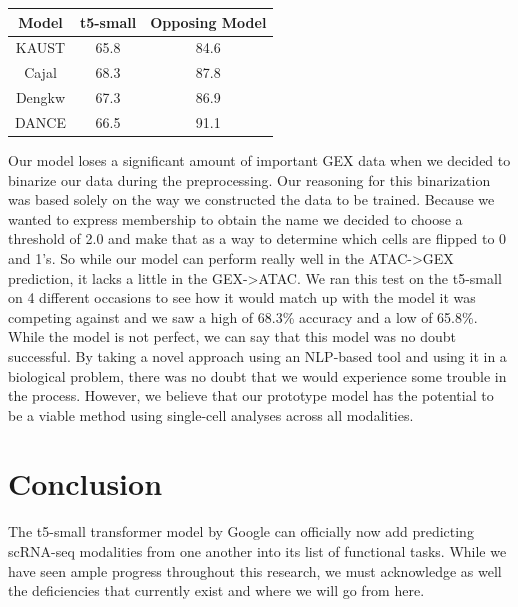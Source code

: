 \begin{table}[h!]
\centering
 \begin{tabular}{||c | c | c||} 
 \hline
 Model & t5-small & Opposing Model \\ [0.5ex] 
 \hline\hline
 KAUST & 65.8 & 84.6  \\ 
 Cajal & 68.3 & 87.8  \\
 Dengkw & 67.3 & 86.9  \\
 DANCE & 66.5 & 91.1  \\ [1ex]
 \hline
 \end{tabular}
\end{table}

Our model loses a significant amount of important GEX data when we decided to binarize our data during the preprocessing. Our reasoning for this binarization was based solely on the way we constructed the data to be trained. Because we wanted to express membership to obtain the name we decided to choose a threshold of 2.0 and make that as a way to determine which cells are flipped to 0 and 1's. So while our model can perform really well in the ATAC->GEX prediction, it lacks a little in the GEX->ATAC. We ran this test on the t5-small on 4 different occasions to see how it would match up with the model it was competing against and we saw a high of 68.3\% accuracy and a low of 65.8\%. While the model is not perfect, we can say that this model was no doubt successful. By taking a novel approach using an NLP-based tool and using it in a biological problem, there was no doubt that we would experience some trouble in the process. However, we believe that our prototype model has the potential to be a viable method using single-cell analyses across all modalities.  

\section{Conclusion}

The t5-small transformer model by Google can officially now add predicting scRNA-seq modalities from one another into its list of functional tasks.  While we have seen ample progress throughout this research, we must acknowledge as well the deficiencies
that currently exist and where we will go from here.

